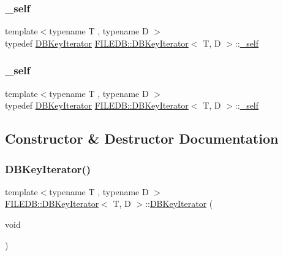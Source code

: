 \subsubsection{\texorpdfstring{\_self}{\_self}\hspace{0.1cm}{\footnotesize\ttfamily [1/2]}}
{\footnotesize\ttfamily template$<$typename T , typename D $>$ \\
typedef \mbox{\hyperlink{classFILEDB_1_1DBKeyIterator}{D\+B\+Key\+Iterator}} \mbox{\hyperlink{classFILEDB_1_1DBKeyIterator}{F\+I\+L\+E\+D\+B\+::\+D\+B\+Key\+Iterator}}$<$ T, D $>$\+::\mbox{\hyperlink{classFILEDB_1_1DBKeyIterator_aaf7773c7a848ec6e04bc738dd794ace1}{\+\_\+self}}}

\mbox{\label{classFILEDB_1_1DBKeyIterator_aaf7773c7a848ec6e04bc738dd794ace1}} 
\subsubsection{\texorpdfstring{\_self}{\_self}\hspace{0.1cm}{\footnotesize\ttfamily [2/2]}}
{\footnotesize\ttfamily template$<$typename T , typename D $>$ \\
typedef \mbox{\hyperlink{classFILEDB_1_1DBKeyIterator}{D\+B\+Key\+Iterator}} \mbox{\hyperlink{classFILEDB_1_1DBKeyIterator}{F\+I\+L\+E\+D\+B\+::\+D\+B\+Key\+Iterator}}$<$ T, D $>$\+::\mbox{\hyperlink{classFILEDB_1_1DBKeyIterator_aaf7773c7a848ec6e04bc738dd794ace1}{\+\_\+self}}}



\subsection{Constructor \& Destructor Documentation}
\mbox{\label{classFILEDB_1_1DBKeyIterator_aece085c0a59d87759e01613b5c64ef36}} 
\subsubsection{\texorpdfstring{DBKeyIterator()}{DBKeyIterator()}\hspace{0.1cm}{\footnotesize\ttfamily [1/6]}}
{\footnotesize\ttfamily template$<$typename T , typename D $>$ \\
\mbox{\hyperlink{classFILEDB_1_1DBKeyIterator}{F\+I\+L\+E\+D\+B\+::\+D\+B\+Key\+Iterator}}$<$ T, D $>$\+::\mbox{\hyperlink{classFILEDB_1_1DBKeyIterator}{D\+B\+Key\+Iterator}} (\begin{DoxyParamCaption}\item[{void}]{ }\end{DoxyParamCaption})\hspace{0.3cm}{\ttfamily [inline]}}

